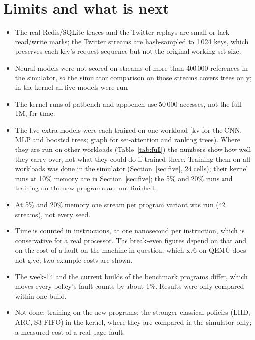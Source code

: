 \documentclass[10.5pt,a4paper]{article}
\begin{document}
\section{Limits and what is next}
\begin{itemize}
\item The real Redis/SQLite traces and the Twitter replays are small or lack read/write marks; the Twitter streams are
  hash-sampled to 1\,024 keys, which preserves each key's request sequence but not the original working-set size.
\item Neural models were not scored on streams of more than 400\,000 references in the simulator, so the simulator comparison on those streams covers trees only; in the kernel all five models were run.
\item The kernel runs of patbench and appbench use 50\,000 accesses, not the full 1M, for time.
\item The five extra models were each trained on one workload (kv for the CNN, MLP and boosted trees; graph for set-attention and
  ranking trees). Where they are run on other workloads (Table~\ref{tab:full}) the numbers show how well they carry over, not what
  they could do if trained there. Training them on all workloads was done in the simulator (Section~\ref{sec:five}, 24 cells); their kernel runs at 10\% memory are in Section~\ref{sec:five}; the 5\% and 20\% runs and training on the new programs are not finished.
\item At 5\% and 20\% memory one stream per program variant was run (42 streams), not every seed.
\item Time is counted in instructions, at one nanosecond per instruction, which is conservative for a real processor. The break-even
  figures depend on that and on the cost of a fault on the machine in question, which xv6 on QEMU does not give; two example costs are shown.
\item The week-14 and the current builds of the benchmark programs differ, which moves every policy's fault counts by about 1\%. Results
  were only compared within one build.
\item Not done: training on the new programs; the stronger classical policies (LHD, ARC, S3-FIFO) in the kernel, where they are compared in the simulator only; a measured cost of a real page fault.
\end{itemize}
\end{document}
